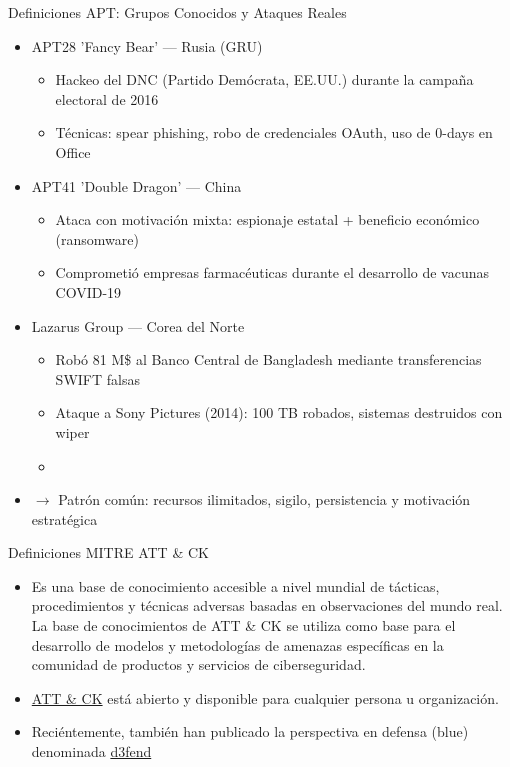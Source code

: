 \documentclass[aspectratio=169,11pt]{beamer}
\begin{document}
\begin{frame}[allowframebreaks]{Definiciones}
\small
  APT: Grupos Conocidos y Ataques Reales

  \begin{itemize}
  \item APT28 'Fancy Bear' --- Rusia (GRU)
  \begin{itemize}

  \item Hackeo del DNC (Partido Demócrata, EE.UU.) durante la campaña electoral de 2016
  \item Técnicas: spear phishing, robo de credenciales OAuth, uso de 0-days en Office
  \end{itemize}
  \item APT41 'Double Dragon' --- China

  \begin{itemize}

  \item Ataca con motivación mixta: espionaje estatal + beneficio económico (ransomware)
  \item Comprometió empresas farmacéuticas durante el desarrollo de vacunas COVID-19
    \end{itemize}
  \item Lazarus Group --- Corea del Norte
  \begin{itemize}

  \item Robó 81 M\$ al Banco Central de Bangladesh mediante transferencias SWIFT falsas
  \item Ataque a Sony Pictures (2014): 100 TB robados, sistemas destruidos con wiper
  \item   \end{itemize}
  \item $\rightarrow$ Patrón común: recursos ilimitados, sigilo, persistencia y motivación estratégica
  \end{itemize}
\end{frame}

\begin{frame}[allowframebreaks]{Definiciones}
\small
MITRE ATT \& CK\textregistered{}
  \begin{itemize}
  \item Es una base de conocimiento accesible a nivel mundial de tácticas, procedimientos y técnicas adversas basadas en observaciones del mundo real. La base de conocimientos de ATT \& CK se utiliza como base para el desarrollo de modelos y metodologías de amenazas específicas en la comunidad de productos y servicios de ciberseguridad.
  \item \href{https://attack.mitre.org/\#}{ATT \& CK} está abierto y disponible para cualquier persona u organización.
  \item Reciéntemente, también han publicado la perspectiva en defensa (blue) denominada \href{https://d3fend.mitre.org/}{d3fend}
  \end{itemize}
\end{frame}
\end{document}
